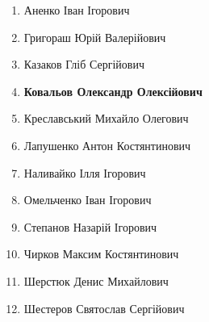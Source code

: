 \documentclass[14pt, a4paper]{extreport}
\begin{document}
	\begin{enumerate}
		\item Аненко Іван Ігорович
		
		\item Григораш Юрій Валерійович
		
		\item Казаков Гліб Сергійович
		
		\item \textbf{Ковальов Олександр Олексійович}
		
		\item Креславський Михайло Олегович
		
		\item Лапушенко Антон Костянтинович
		
		\item Наливайко Ілля Ігорович
		
		\item Омельченко Іван Ігорович
		
		\item Степанов Назарій Ігорович
		
		\item Чирков Максим Костянтинович
		
		\item Шерстюк Денис Михайлович
		
		\item Шестеров Святослав Сергійович
	\end{enumerate}
\end{document}
